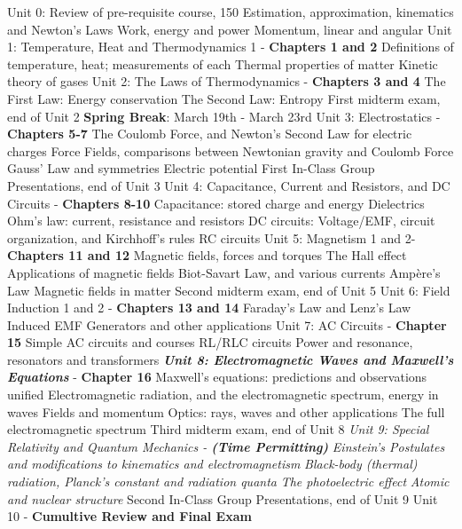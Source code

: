 \documentclass[10pt]{article}
\begin{document}
\begin{outline}[enumerate]
\1 Unit 0: Review of pre-requisite course, 150
\2 Estimation, approximation, kinematics and Newton's Laws
\2 Work, energy and power
\2 Momentum, linear and angular
\1 Unit 1: Temperature, Heat and Thermodynamics 1 - \textbf{Chapters 1 and 2}
\2 Definitions of temperature, heat; measurements of each
\2 Thermal properties of matter
\2 Kinetic theory of gases
\1 Unit 2: The Laws of Thermodynamics - \textbf{Chapters 3 and 4}
\2 The First Law: Energy conservation 
\2 The Second Law: Entropy
\1 First midterm exam, end of Unit 2
\1 \textbf{Spring Break}: March 19th - March 23rd
\1 Unit 3: Electrostatics - \textbf{Chapters 5-7}
\2 The Coulomb Force, and Newton's Second Law for electric charges
\2 Force Fields, comparisons between Newtonian gravity and Coulomb Force
\2 Gauss' Law and symmetries
\2 Electric potential
\1 First In-Class Group Presentations, end of Unit 3
\1 Unit 4: Capacitance, Current and Resistors, and DC Circuits - \textbf{Chapters 8-10}
\2 Capacitance: stored charge and energy
\2 Dielectrics
\2 Ohm's law: current, resistance and resistors
\2 DC circuits: Voltage/EMF, circuit organization, and Kirchhoff's rules
\2 RC circuits
\1 Unit 5: Magnetism 1 and 2- \textbf{Chapters 11 and 12}
\2 Magnetic fields, forces and torques
\2 The Hall effect
\2 Applications of magnetic fields
\2 Biot-Savart Law, and various currents
\2 Amp\`{e}re's Law
\2 Magnetic fields in matter
\1 Second midterm exam, end of Unit 5
\1 Unit 6: Field Induction 1 and 2 - \textbf{Chapters 13 and 14}
\2 Faraday's Law and Lenz's Law
\2 Induced EMF
\2 Generators and other applications
\1 Unit 7: AC Circuits - \textbf{Chapter 15}
\2 Simple AC circuits and courses
\2 RL/RLC circuits
\2 Power and resonance, resonators and transformers
\1 \textit{\textbf{ Unit 8: Electromagnetic Waves and Maxwell's Equations}} - \textbf{Chapter 16}
\2 Maxwell's equations: predictions and observations unified
\2 Electromagnetic radiation, and the electromagnetic spectrum, energy in waves
\2 Fields and momentum
\2 Optics: rays, waves and other applications
\2 The full electromagnetic spectrum
\1 Third midterm exam, end of Unit 8
\1 \textit{Unit 9: Special Relativity and Quantum Mechanics - \textbf{(Time Permitting)}}
\2 \textit{Einstein's Postulates and modifications to kinematics and electromagnetism}
\2 \textit{Black-body (thermal) radiation, Planck's constant and radiation quanta}
\2 \textit{The photoelectric effect}
\2 \textit{Atomic and nuclear structure}
\1 Second In-Class Group Presentations, end of Unit 9
\1 Unit 10 - \textbf{Cumultive Review and Final Exam}
\end{outline}
\end{document}
